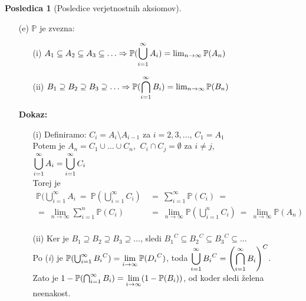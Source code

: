 \documentclass[11pt]{article}
\theoremstyle{definition}
\theoremstyle{definition}
\theoremstyle{definition}
\newtheorem*{posledica}{Posledica}
\begin{document}
\begin{posledica}[Posledice verjetnostnih aksiomov]
\begin{enumerate}
\item[(e)] $\mathbb{P}$ je zvezna:
\begin{enumerate}
	\item[(i)] $A_1 \subseteq A_2 \subseteq A_3 \subseteq \ldots \Rightarrow \mathbb{P}(\mathlarger{\bigcup_{i=1}^{\infty} A_i}) = \lim_{n \rightarrow \infty} \mathbb{P}(A_n)$
	\item[(ii)] $B_1 \supseteq B_2 \supseteq B_3 \supseteq \ldots \Rightarrow \mathbb{P}(\mathlarger{\bigcap_{i=1}^{\infty} B_i}) = \lim_{n \rightarrow \infty} \mathbb{P}(B_n)$
\end{enumerate} 
\textbf{Dokaz:}
\begin{enumerate}
	\item[(i)] Definiramo: $C_i = A_i \setminus A_{i-1}$ za $i = 2, 3, \ldots$, $C_1 = A_1$ \\
	Potem je $A_n = C_1 \cup \ldots \cup C_n$, $~C_i \cap C_j = \emptyset$ za $i \neq j$, \\ 
	$\mathlarger{\bigcup_{i=1}^{\infty} A_i} = \mathlarger{\bigcup_{i=1}^{\infty} C_i}$ \\
	Torej je 
	\begin{align*}
	\mathbb{P}(\bigcup_{i=1}^{\infty} A_i ~=~ \mathbb{P}(\bigcup_{i=1}^{\infty} C_i) ~&=~ \sum_{i=1}^{\infty} \mathbb{P}(C_i) ~= \\
	=~ \lim_{n \rightarrow \infty} \sum_{i=1}^{n} \mathbb{P}(C_i) ~&=~ \lim_{n \rightarrow \infty} \mathbb{P}(\bigcup_{i=1}^{n} C_i) ~=~ \lim_{n \rightarrow \infty} \mathbb{P}(A_n) \\
	\end{align*}
	\item[(ii)] Ker je $B_1 \supseteq B_2 \supseteq B_3 \supseteq \ldots$, sledi ${B_1}^C \subseteq {B_2}^C \subseteq {B_3}^C \subseteq \ldots$ \\
	Po (\textit{i}) je $\mathbb{P}(\bigcup_{i=1}^{\infty} {B_i}^C) = \mathlarger{\lim_{i \rightarrow \infty} \mathbb{P}({D_i}^C)}$, toda $\mathlarger{\bigcup_{i=1}^{\infty} {B_i}^C = \left( \bigcap_{i=1}^{\infty} B_i \right)^C}$. \\
	Zato je $1 - \mathbb{P}(\bigcap_{i=1}^{\infty} B_i) = \mathlarger{\lim_{i \rightarrow \infty}} (1 - \mathbb{P}(B_i))$, od koder sledi želena neenakost.
\end{enumerate}
\end{enumerate}
\end{posledica}
\vspace{0.5cm}

\end{document}
